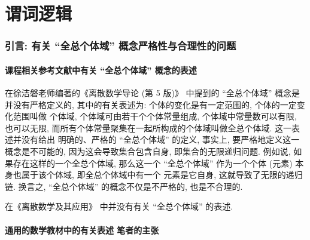 \documentclass[10pt,UTF8]{book} %
\begin{document}
\newpage
\thispagestyle{empty}

\chapter{谓词逻辑}

\subsection*{引言: 有关 “全总个体域” 概念严格性与合理性的问题}
\setcounter{subsubsection}{0}
\subsubsection{课程相关参考文献中有关 “全总个体域” 概念的表述}

在徐洁磐老师编著的《离散数学导论 (第 5 版)》 \cite{徐洁磐} 中提到的 “全总个体域” 概念是并没有严格定义的,
其中的有关表述为: {\kaishu 个体的变化是有一定范围的, 个体的一定变化范围叫做
个体域, 个体域可由若干个个体常量组成, 个体域中常量数可以有限, 也可以无限,
而所有个体常量聚集在一起所构成的个体域叫做全总个体域}. 这一表述并没有给出
明确的、严格的 “全总个体域” 的定义, 事实上, 要严格地定义这一概念是不可能的,
因为这会导致集合包含自身, 即集合的无限递归问题. 例如说, 如果存在这样的一个全总个体域,
那么这一个 “全总个体域” 作为一个个体 (元素) 本身也属于该个体域, 即全总个体域中有一个
元素是它自身, 这就导致了无限的递归链. 
换言之, “全总个体域” 的概念不仅是不严格的, 也是不合理的.

在《离散数学及其应用》\cite{离散数学及其应用} 中并没有有关 “全总个体域” 的表述.

\subsubsection{通用的数学教材中的有关表述 \quad 笔者的主张}
\end{document}
